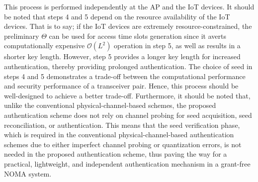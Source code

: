 \documentclass[journal,10pt]{IEEEtran}
\begin{document}
This process is performed independently at the AP and the IoT devices. It should be noted that steps 4 and 5 depend on the resource availability of the IoT devices. That is to say; if the IoT devices are extremely resource-constrained, the preliminary $\Theta$ can be used for access time slots generation since it averts computationally expensive $\mathcal{O}(L^2)$ operation in step 5, as well as results in a shorter key length. However, step 5 provides a longer key length for increased authentication, thereby providing prolonged authentication. The choice of seed in steps 4 and 5 demonstrates a trade-off between the computational performance and security performance of a transceiver pair. Hence, this process should be well-designed to achieve a better trade-off. Furthermore, it should be noted that, unlike the conventional physical-channel-based schemes, the proposed authentication scheme does not rely on channel probing for seed acquisition, seed reconciliation, or authentication. This means that the seed verification phase, which is required in the conventional physical-channel-based authentication schemes due to either imperfect channel probing or quantization errors, is not needed in the proposed authentication scheme, thus paving the way for a practical, lightweight, and independent authentication mechanism in a grant-free NOMA system. 
\end{document}

